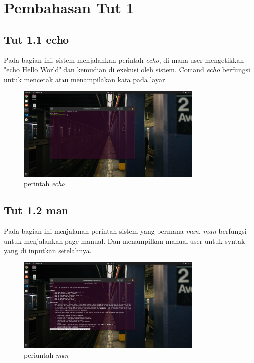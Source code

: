 \documentclass[11pt,a4paper]{article}
\begin{document}
\section{Pembahasan Tut 1}
\subsection{Tut 1.1 echo}
    Pada bagian ini, sistem menjalankan perintah \textit{echo}, di mana user mengetikkan "echo Hello World" dan kemudian di exekusi oleh sistem.
	Comand \textit{echo} berfungsi untuk mencetak atau menampilakan kata pada layar.
	\begin{figure}[h]
		\centering
		\includegraphics[width=0.8\textwidth]{figure/tut1_bagian1.png}
		\caption{perintah \textit{echo}}
	\end{figure}

\subsection{Tut 1.2 man}
	Pada bagian ini menjalanan perintah sistem yang bermana \textit{man}. \textit{man} berfungsi untuk menjalankan page manual. Dan menampilkan manual user untuk syntak yang di inputkan setelahnya.
    
	\begin{figure}[h]
		\centering
		\includegraphics[width=0.8\textwidth]{figure/tut1_bagian2.png}
		\caption{periuntah \textit{man}}
	\end{figure}
\end{document}
